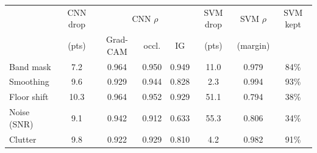 \begin{tabular}{@{}lccccccc@{}}\toprule
 & CNN drop & \multicolumn{3}{c}{CNN $\rho$} & SVM drop & SVM $\rho$ & SVM kept\\
 & (pts) & Grad-CAM & occl. & IG & (pts) & (margin) & \\\midrule
Band mask & 7.2 & 0.964 & 0.950 & 0.949 & 11.0 & 0.979 & 84\% \\
Smoothing & 9.6 & 0.929 & 0.944 & 0.828 & 2.3 & 0.994 & 93\% \\
Floor shift & 10.3 & 0.964 & 0.952 & 0.929 & 51.1 & 0.794 & 38\% \\
Noise (SNR) & 9.1 & 0.942 & 0.912 & 0.633 & 55.3 & 0.806 & 34\% \\
Clutter & 9.8 & 0.922 & 0.929 & 0.810 & 4.2 & 0.982 & 91\% \\
\bottomrule\end{tabular}
